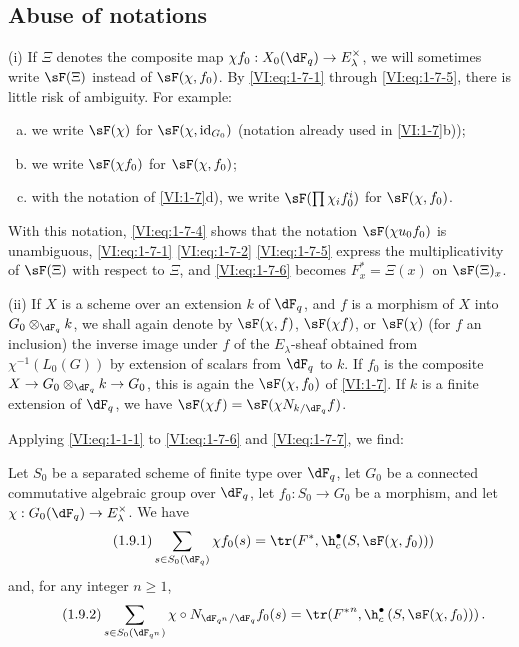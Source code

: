 \documentclass[oneside]{book}
\begin{document}
\subsection{Abuse of notations}\label{VI:1-8}

(i) If $\Xi$ denotes the composite map 
$\chi f_0:X_0(\dF_q) \to E_\lambda^\times$, we will sometimes write $\sF(\Xi)$ 
instead of $\sF(\chi,f_0)$. By \eqref{VI:eq:1-7-1} through \eqref{VI:eq:1-7-5}, 
there is little risk of ambiguity. For example:
\begin{enumerate}[a)]
  \item we write $\sF(\chi)$ for $\sF(\chi,\operatorname{id}_{G_0})$ 
    (notation already used in \ref{VI:1-7}b)); 
  \item we write $\sF(\chi f_0)$ for $\sF(\chi,f_0)$;
  \item with the notation of \ref{VI:1-7}d), we write 
    $\sF(\prod \chi_i f_0^i)$ for $\sF(\chi,f_0)$. 
\end{enumerate}

With this notation, \eqref{VI:eq:1-7-4} shows that the notation 
$\sF(\chi u_0 f_0)$ is unambiguous, \eqref{VI:eq:1-7-1} \eqref{VI:eq:1-7-2} 
\eqref{VI:eq:1-7-5} express the multiplicativity of $\sF(\Xi)$ with respect to $\Xi$, 
and \eqref{VI:eq:1-7-6} becomes $F_x^\ast = \Xi(x)$ on $\sF(\Xi)_x$.

(ii) If $X$ is a scheme over an extension $k$ of $\dF_q$, and $f$ is a 
morphism of $X$ into $G_0\otimes_{\dF_q} k$, we shall again denote by $\sF(\chi,f)$, 
$\sF(\chi f)$, or $\sF(\chi)$ (for $f$ an inclusion) the inverse image under 
$f$ of the $E_\lambda$-sheaf obtained from $\chi^{-1}(L_0(G))$ by extension of 
scalars from $\dF_q$ to $k$. If $f_0$ is the composite 
$X\to G_0\otimes_{\dF_q} k \to G_0$, this is again the $\sF(\chi,f_0)$ of 
\ref{VI:1-7}. If $k$ is a finite extension of $\dF_q$, we have 
$\sF(\chi f) = \sF(\chi N_{k/\dF_q} f)$. 

Applying \eqref{VI:eq:1-1-1} to \eqref{VI:eq:1-7-6} and \eqref{VI:eq:1-7-7}, 
we find: 





\begin{theorem_}\label{VI:1-9}
Let $S_0$ be a separated scheme of finite type over $\dF_q$, let $G_0$ be a 
connected commutative algebraic group over $\dF_q$, let $f_0:S_0\to G_0$ be a morphism, and let 
$\chi:G_0(\dF_q) \to E_\lambda^\times$. We have 
\begin{equation*}\tag{1.9.1}\label{VI:eq:1-9-1}
  \sum_{s\in S_0(\dF_q)} \chi f_0(s) = \tr(F^\ast,\h_c^\bullet(S,\sF(\chi,f_0))) 
\end{equation*}
and, for any integer $n\geqslant 1$,
\begin{equation*}\tag{1.9.2}\label{VI:eq:1-9-2}
  \sum_{s\in S_0(\dF_{q^n})} \chi\circ N_{\dF_{q^n}/\dF_q} f_0(s) = \tr({F^\ast}^n, \h_c^\bullet\left(S,\sF(\chi,f_0))\right) \text{.}
\end{equation*}
\end{theorem_}
\end{document}
